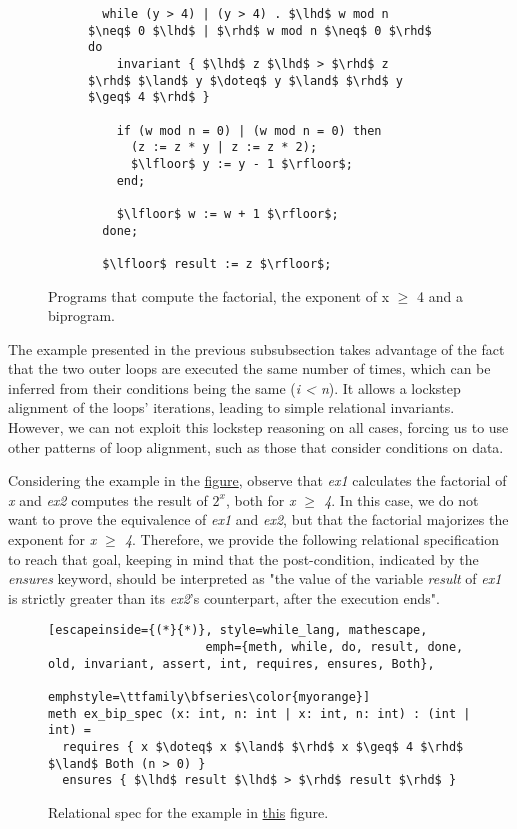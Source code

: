 \begin{figure}[h]
\begin{subfigure}[t]{0.99\textwidth}
\begin{lstlisting}
  while (y > 4) | (y > 4) . $\lhd$ w mod n $\neq$ 0 $\lhd$ | $\rhd$ w mod n $\neq$ 0 $\rhd$ do
    invariant { $\lhd$ z $\lhd$ > $\rhd$ z $\rhd$ $\land$ y $\doteq$ y $\land$ $\rhd$ y $\geq$ 4 $\rhd$ }

    if (w mod n = 0) | (w mod n = 0) then
      (z := z * y | z := z * 2);
      $\lfloor$ y := y - 1 $\rfloor$;
    end;

    $\lfloor$ w := w + 1 $\rfloor$;
  done;

  $\lfloor$ result := z $\rfloor$;
    \end{lstlisting}
  \end{subfigure}

  \caption{Programs that compute the factorial, the exponent of x $\geq$ 4 and a biprogram.}
  \label{fig:cond_align_loops_ex}
\end{figure}

The example presented in the previous subsubsection takes advantage of the fact that the two outer loops are executed the same number of times, which can be inferred from their conditions being the same (\emph{i < n}).
It allows a lockstep alignment of the loops' iterations, leading to simple relational invariants.
However, we can not exploit this lockstep reasoning on all cases, forcing us to use other patterns of loop alignment, such as those that consider conditions on data.

Considering the example in the \hyperref[fig:cond_align_loops_ex]{figure}, observe that \emph{ex1} calculates the factorial of \emph{x} and \emph{ex2} computes the result of \emph{$2^x$}, both for \emph{x $\geq$ 4}.
In this case, we do not want to prove the equivalence of \emph{ex1} and \emph{ex2}, but that the factorial majorizes the exponent for \emph{x $\geq$ 4}.
Therefore, we provide the following relational specification to reach that goal, keeping in mind that the post-condition, indicated by the \emph{ensures} keyword, should be interpreted as "the value of the variable \emph{result} of \emph{ex1} is strictly greater than its \emph{ex2}'s counterpart, after the execution ends".

\begin{figure}[h]
  \centering
  \noindent
  \begin{lstlisting}[escapeinside={(*}{*)}, style=while_lang, mathescape,
                      emph={meth, while, do, result, done, old, invariant, assert, int, requires, ensures, Both},
                      emphstyle=\ttfamily\bfseries\color{myorange}]
meth ex_bip_spec (x: int, n: int | x: int, n: int) : (int | int) =
  requires { x $\doteq$ x $\land$ $\rhd$ x $\geq$ 4 $\rhd$ $\land$ Both (n > 0) }
  ensures { $\lhd$ result $\lhd$ > $\rhd$ result $\rhd$ }
  \end{lstlisting}
  \caption{Relational spec for the example in \hyperref[fig:cond_align_loops_ex]{this} figure.}
  \label{fig:cond_align_loops_rel_spec}
\end{figure}

